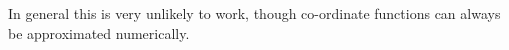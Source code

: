 In general this is very unlikely to work, though co-ordinate functions can always be approximated numerically.%
% 


\goodbreak


